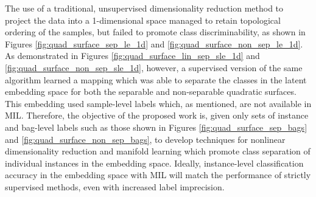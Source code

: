 The use of a traditional, unsupervised dimensionality reduction method to project the data into a 1-dimensional space managed to retain  topological ordering of the samples, but failed to promote class discriminability, as shown in Figures \ref{fig:quad_surface_sep_le_1d} and \ref{fig:quad_surface_non_sep_le_1d}.  As demonstrated in Figures \ref{fig:quad_surface_lin_sep_sle_1d} and \ref{fig:quad_surface_non_sep_sle_1d}, however, a supervised version of the same algorithm learned a mapping which was able to separate the classes in the latent embedding space for both the separable and non-separable quadratic surfaces.  This embedding used sample-level labels which, as mentioned, are not available in MIL.  Therefore,  the objective of the proposed work is, given only sets of instance and bag-level labels such as those shown in Figures \ref{fig:quad_surface_sep_bags} and \ref{fig:quad_surface_non_sep_bags}, to develop techniques for nonlinear dimensionality reduction and manifold learning which promote class separation of individual instances in the embedding space.  Ideally, instance-level classification accuracy in the embedding space with MIL will match the performance of strictly supervised methods, even with increased label imprecision. 

